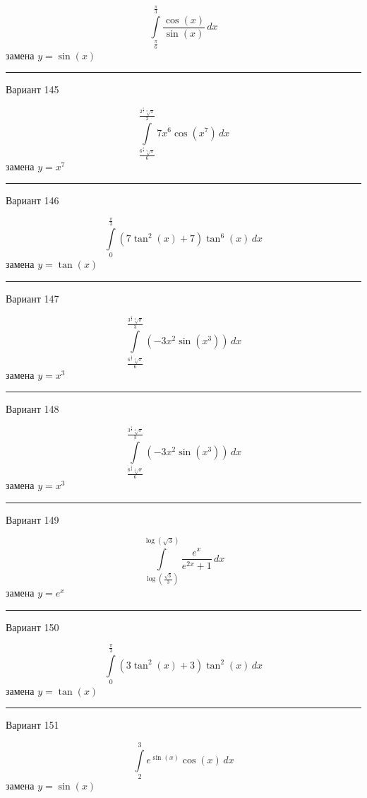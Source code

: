 \documentclass[11pt]{report}
\begin{document}
$$\int\limits_{\frac{\pi}{6}}^{\frac{\pi}{3}} \frac{\cos{\left(x \right)}}{\sin{\left(x \right)}}\, dx$$
замена $y = \sin{\left(x \right)}$



\rule{\textwidth}{.2mm}

Вариант 145

$$\int\limits_{\frac{6^{\frac{6}{7}} \sqrt[7]{\pi}}{6}}^{\frac{2^{\frac{5}{7}} \sqrt[7]{\pi}}{2}} 7 x^{6} \cos{\left(x^{7} \right)}\, dx$$
замена $y = x^{7}$



\rule{\textwidth}{.2mm}

Вариант 146

$$\int\limits_{0}^{\frac{\pi}{3}} \left(7 \tan^{2}{\left(x \right)} + 7\right) \tan^{6}{\left(x \right)}\, dx$$
замена $y = \tan{\left(x \right)}$



\rule{\textwidth}{.2mm}

Вариант 147

$$\int\limits_{\frac{6^{\frac{2}{3}} \sqrt[3]{\pi}}{6}}^{\frac{3^{\frac{2}{3}} \sqrt[3]{\pi}}{3}} \left(- 3 x^{2} \sin{\left(x^{3} \right)}\right)\, dx$$
замена $y = x^{3}$



\rule{\textwidth}{.2mm}

Вариант 148

$$\int\limits_{\frac{6^{\frac{2}{3}} \sqrt[3]{\pi}}{6}}^{\frac{3^{\frac{2}{3}} \sqrt[3]{\pi}}{3}} \left(- 3 x^{2} \sin{\left(x^{3} \right)}\right)\, dx$$
замена $y = x^{3}$



\rule{\textwidth}{.2mm}

Вариант 149

$$\int\limits_{\log{\left(\frac{\sqrt{3}}{3} \right)}}^{\log{\left(\sqrt{3} \right)}} \frac{e^{x}}{e^{2 x} + 1}\, dx$$
замена $y = e^{x}$



\rule{\textwidth}{.2mm}

Вариант 150

$$\int\limits_{0}^{\frac{\pi}{3}} \left(3 \tan^{2}{\left(x \right)} + 3\right) \tan^{2}{\left(x \right)}\, dx$$
замена $y = \tan{\left(x \right)}$



\rule{\textwidth}{.2mm}

Вариант 151

$$\int\limits_{2}^{3} e^{\sin{\left(x \right)}} \cos{\left(x \right)}\, dx$$
замена $y = \sin{\left(x \right)}$
\end{document}
